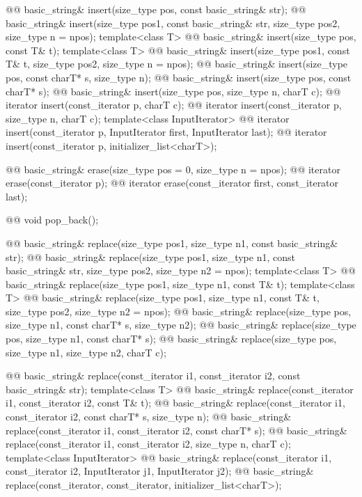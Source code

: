 \documentclass{wg21}
\begin{document}
\begin{codeblock}
{{    @@ basic_string& insert(size_type pos, const basic_string& str);
    @@ basic_string& insert(size_type pos1, const basic_string& str,
                                             size_type pos2, size_type n = npos);
    template<class T>
      @@ basic_string& insert(size_type pos, const T& t);
    template<class T>
      @@ basic_string& insert(size_type pos1, const T& t, size_type pos2, size_type n = npos);
    @@ basic_string& insert(size_type pos, const charT* s, size_type n);
    @@ basic_string& insert(size_type pos, const charT* s);
    @@ basic_string& insert(size_type pos, size_type n, charT c);
    @@ iterator insert(const_iterator p, charT c);
    @@ iterator insert(const_iterator p, size_type n, charT c);
    template<class InputIterator>
      @@ iterator insert(const_iterator p, InputIterator first, InputIterator last);
    @@ iterator insert(const_iterator p, initializer_list<charT>);

    @@ basic_string& erase(size_type pos = 0, size_type n = npos);
    @@ iterator erase(const_iterator p);
    @@ iterator erase(const_iterator first, const_iterator last);

    @@ void pop_back();

    @@ basic_string& replace(size_type pos1, size_type n1, const basic_string& str);
    @@ basic_string& replace(size_type pos1, size_type n1, const basic_string& str,
                                              size_type pos2, size_type n2 = npos);
    template<class T>
      @@ basic_string& replace(size_type pos1, size_type n1, const T& t);
    template<class T>
      @@ basic_string& replace(size_type pos1, size_type n1, const T& t,
                                                size_type pos2, size_type n2 = npos);
    @@ basic_string& replace(size_type pos, size_type n1, const charT* s, size_type n2);
    @@ basic_string& replace(size_type pos, size_type n1, const charT* s);
    @@ basic_string& replace(size_type pos, size_type n1, size_type n2, charT c);

    @@
    basic_string& replace(const_iterator i1, const_iterator i2, const basic_string& str);
    template<class T>
      @@
      basic_string& replace(const_iterator i1, const_iterator i2, const T& t);
    @@
    basic_string& replace(const_iterator i1, const_iterator i2, const charT* s, size_type n);
    @@
    basic_string& replace(const_iterator i1, const_iterator i2, const charT* s);
    @@
    basic_string& replace(const_iterator i1, const_iterator i2, size_type n, charT c);
    template<class InputIterator>
      @@ basic_string& replace(const_iterator i1, const_iterator i2,
                                                InputIterator j1, InputIterator j2);
    @@ basic_string& replace(const_iterator, const_iterator, initializer_list<charT>);

}}
\end{codeblock}
\end{document}
